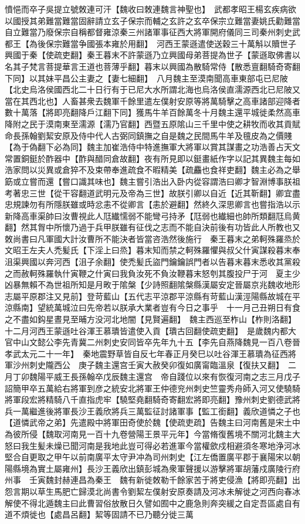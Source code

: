 憤悒而卒子吳提立號敇連可汗【魏收曰敇連魏言神聖也】　武都孝昭王楊玄疾病欲以國授其弟難當難當固辭請立玄子保宗而輔之玄許之玄卒保宗立難當妻姚氏勸難當自立難當乃廢保宗自稱都督雍涼秦三州諸軍事征西大將軍開府儀同三司秦州刺史武都王【為後保宗難當争國張本雍於用翻】　河西王蒙遜遣使送穀三十萬斛以贖世子興國于秦【使疏吏翻】秦王暮末不許蒙遜乃立興國母弟菩提為世子【蒙遜取佛書以名其子梵言菩提華言王道也菩薄乎翻】暮末以興國為散騎常侍【散悉亶翻騎奇寄翻下同】以其妹平昌公主妻之【妻七細翻】　八月魏主至漠南聞高車東部屯已尼陂【北史烏洛侯國西北二十日行有于已尼大水所謂北海也烏洛侯直濡源西北已尼陂又當在其西北也】人畜甚衆去魏軍千餘里遣左僕射安原等將萬騎擊之高車諸部迎降者數十萬落【將即亮翻降戶江翻下同】獲馬牛羊百餘萬冬十月魏主還平城徙柔然高車降附之民于漠南東至濡源【濡乃官翻】西暨五原隂山三千里中使之耕牧而收其貢賦命長孫翰劉絜安原及侍中代人古弼同鎮撫之自是魏之民間馬牛羊及氊皮為之價賤【為于偽翻下必為同】魏主加崔浩侍中特進撫軍大將軍以賞其謀畫之功浩善占天文常置銅鋌於酢器中【酢與醋同倉故翻】夜有所見即以鋌畫紙作字以記其異魏主每如浩家問以災異或倉猝不及束帶奉進疏食不暇精美【疏麤也食祥吏翻】魏主必為之舉筯或立嘗而還【嘗口識其味也】魏主嘗引浩出入卧内從容謂浩曰卿才智淵博事朕祖考著忠三世【從干容翻道武明元及帝為三世】故朕引卿以自近【近其靳翻】卿宜盡忠規諫勿有所隱朕雖或時忿恚不從卿言【恚於避翻】然終久深思卿言也嘗指浩以示新降高車渠帥曰汝曹視此人尫纎懦弱不能彎弓持矛【尫弱也纎細也帥所類翻尫烏黄翻】然其胷中所懷乃過于兵甲朕雖有征伐之志而不能自決前後有功皆此人所教也又敇尚書曰凡軍國大計汝曹所不能決者皆當咨浩然後施行　秦王暮末之弟軻殊羅烝於文昭王左夫人禿髪氏【下淫上曰烝】暮末知而禁之軻殊羅懼與叔父什寅謀殺暮末奉沮渠興國以奔河西【沮子余翻】使禿髪氏盜門鑰鑰誤門者以告暮末暮末悉收其黨殺之而赦軻殊羅執什寅鞭之什寅曰我負汝死不負汝鞭暮末怒刳其腹投尸于河　夏主少凶暴無賴不為世祖所知是月畋于隂槃【少詩照翻隂槃縣漢屬安定晉屬京兆魏收地形志屬平原郡注又見前】登苛藍山【五代志平涼郡平涼縣有苛藍山漢涇陽縣故城在平涼縣南】望統萬城泣曰先帝若以朕承大業者豈有今日之事乎　十一月己丑朔日有食之不盡如鈎星晝見至晡方没河北地闇【見賢遍翻】　魏主西巡至柞山【柞則洛翻】　十二月河西王蒙遜吐谷渾王慕璝皆遣使入貢【璝古回翻使疏吏翻】　是歲魏内都大官中山文懿公李先青冀二州刺史安同皆卒先年九十五【李先自燕降魏見一百八卷晉孝武太元二十一年】　秦地震野草皆自反七年春正月癸巳以吐谷渾王慕璝為征西將軍沙州刺史隴西公　庚子魏主還宫壬寅大赦癸卯復如廣甯臨溫泉【復扶又翻】　二月丁卯魏陽平威王長孫翰卒戊辰魏主還宫　帝自踐位以來有恢復河南之志三月戊子詔簡甲卒五萬給右將軍到彦之統安北將軍王仲德兖州刺史竺靈秀舟師入河又使驍騎將軍段宏將精騎八千直指虎牢【驍堅堯翻騎奇寄翻宏將即亮翻】豫州刺史劉德武將兵一萬繼進後將軍長沙王義欣將兵三萬監征討諸軍事【監工銜翻】義欣道憐之子也【道憐武帝之弟】先遣殿中將軍田奇使於魏【使疏吏疏】告魏主曰河南舊是宋土中為彼所侵【魏取河南見一百十九卷營陽王景平元年】今當脩復舊境不關河北魏主大怒曰我生髪未燥已聞河南是我地此豈可得必若進軍今當權歛戍相避須冬寒地浄河冰堅合自更取之甲午以前南廣平太守尹冲為司州刺史【江左僑置廣平郡于襄陽宋以朝陽縣境為實土屬雍州】長沙王義欣出鎮彭城為衆軍聲援以游擊將軍胡藩戍廣陵行府州事　壬寅魏封赫連昌為秦王　魏有新徙敇勒千餘家苦于將吏侵漁【將即亮翻】出怨言期以草生馬肥亡歸漠北尚書令劉絜左僕射安原奏請及河冰未解徙之河西向春冰解使不得北遁魏主曰此曹習俗放散日久譬如囿中之鹿急則奔突緩之自定吾區處自有道不煩徙也【處昌呂翻】絜等固請不已乃聽分徙三萬